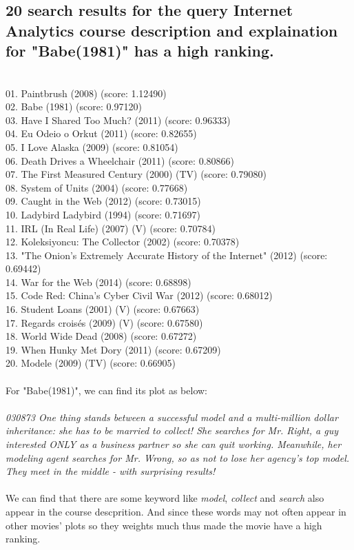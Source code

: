 \documentclass[11pt]{article} %
\begin{document}
\subsection{
20 search results for the query Internet Analytics course description and explaination for "Babe(1981)" has a high ranking. }\\
\tiny
01. Paintbrush (2008) (score: 1.12490)\\
02. Babe (1981) (score: 0.97120)\\
03. Have I Shared Too Much? (2011) (score: 0.96333)\\
04. Eu Odeio o Orkut (2011) (score: 0.82655)\\
05. I Love Alaska (2009) (score: 0.81054)\\
06. Death Drives a Wheelchair (2011) (score: 0.80866)\\
07. The First Measured Century (2000) (TV) (score: 0.79080)\\
08. System of Units (2004) (score: 0.77668)\\
09. Caught in the Web (2012) (score: 0.73015)\\
10. Ladybird Ladybird (1994) (score: 0.71697)\\
11. IRL (In Real Life) (2007) (V) (score: 0.70784)\\
12. Koleksiyoncu: The Collector (2002) (score: 0.70378)\\
13. "The Onion's Extremely Accurate History of the Internet" (2012) (score: 0.69442)\\
14. War for the Web (2014) (score: 0.68898)\\
15. Code Red: China's Cyber Civil War (2012) (score: 0.68012)\\
16. Student Loans (2001) (V) (score: 0.67663)\\
17. Regards croisés (2009) (V) (score: 0.67580)\\
18. World Wide Dead (2008) (score: 0.67272)\\
19. When Hunky Met Dory (2011) (score: 0.67209)\\
20. Modele (2009) (TV) (score: 0.66905)\\
\normalsize
\\
For "Babe(1981)", we can find its plot as below:\\
\\
\emph{
030873	One thing stands between a successful model and a multi-million dollar inheritance: she has to be married to collect! She searches for Mr. Right, a guy interested ONLY as a business partner so she can quit working. Meanwhile, her modeling agent searches for Mr. Wrong, so as not to lose her agency's top model. They meet in the middle - with surprising results!}\\ \\
We can find that there are some keyword like \emph{model}, \emph{collect} and \emph{search} also appear in the course descprition. And since these words may not often appear in other movies' plots so they weights much thus made the movie have a high ranking.
\end{document}
